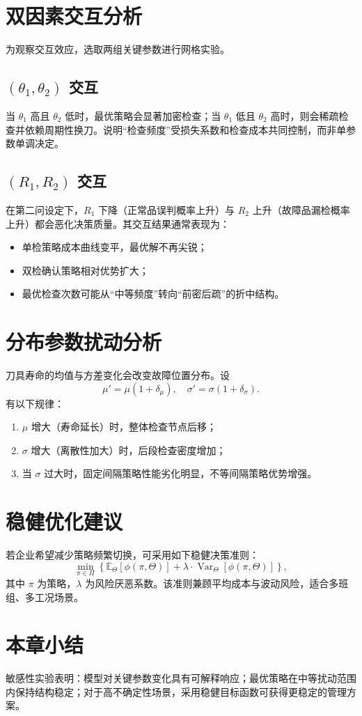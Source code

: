 \section{双因素交互分析}
为观察交互效应，选取两组关键参数进行网格实验。

\subsection{$(\theta_1,\theta_2)$ 交互}
当 $\theta_1$ 高且 $\theta_2$ 低时，最优策略会显著加密检查；当 $\theta_1$ 低且 $\theta_2$ 高时，则会稀疏检查并依赖周期性换刀。说明“检查频度”受损失系数和检查成本共同控制，而非单参数单调决定。

\subsection{$(R_1,R_2)$ 交互}
在第二问设定下，$R_1$ 下降（正常品误判概率上升）与 $R_2$ 上升（故障品漏检概率上升）都会恶化决策质量。其交互结果通常表现为：
\begin{itemize}
  \item 单检策略成本曲线变平，最优解不再尖锐；
  \item 双检确认策略相对优势扩大；
  \item 最优检查次数可能从“中等频度”转向“前密后疏”的折中结构。
\end{itemize}

\section{分布参数扰动分析}
刀具寿命的均值与方差变化会改变故障位置分布。设
\[
\mu'=\mu(1+\delta_\mu),\quad \sigma'=\sigma(1+\delta_\sigma).
\]
有以下规律：
\begin{enumerate}
  \item $\mu$ 增大（寿命延长）时，整体检查节点后移；
  \item $\sigma$ 增大（离散性加大）时，后段检查密度增加；
  \item 当 $\sigma$ 过大时，固定间隔策略性能劣化明显，不等间隔策略优势增强。
\end{enumerate}

\section{稳健优化建议}
若企业希望减少策略频繁切换，可采用如下稳健决策准则：
\[
\min_{\pi\in\Pi}\left\{\mathbb E_{\Theta}[\phi(\pi,\Theta)]+\lambda\cdot \operatorname{Var}_{\Theta}[\phi(\pi,\Theta)]\right\},
\]
其中 $\pi$ 为策略，$\lambda$ 为风险厌恶系数。该准则兼顾平均成本与波动风险，适合多班组、多工况场景。

\section{本章小结}
敏感性实验表明：模型对关键参数变化具有可解释响应；最优策略在中等扰动范围内保持结构稳定；对于高不确定性场景，采用稳健目标函数可获得更稳定的管理方案。

